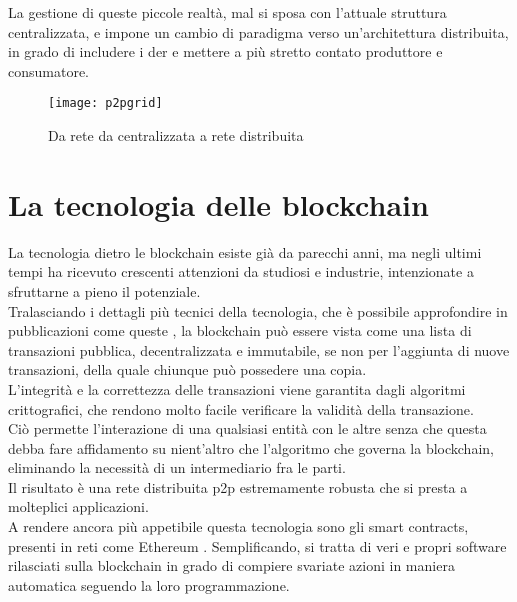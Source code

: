 La gestione di queste piccole realtà, mal si sposa con l'attuale struttura centralizzata, e impone un cambio di paradigma verso un'architettura distribuita, 
in grado di includere i \gls{der} e mettere a più stretto contato produttore e consumatore.

\begin{figure}[h]
    \texttt{[image: p2pgrid]}
    \centering
    \caption{Da rete da centralizzata a rete distribuita \cite{img:p2pgrid}}
    \label{lab:p2pgrid}
\end{figure}


\section{La tecnologia delle blockchain}
La tecnologia dietro le blockchain esiste già da parecchi anni, ma negli ultimi tempi ha ricevuto crescenti attenzioni da studiosi e industrie, intenzionate a sfruttarne a pieno il potenziale. \\

Tralasciando i dettagli più tecnici della tecnologia, che è possibile approfondire in pubblicazioni come queste \cite{art:blockchain} \cite{art:blockchain-for-industry}, 
la blockchain può essere vista come una lista di transazioni pubblica, decentralizzata e immutabile, se non per l'aggiunta di nuove transazioni, della quale chiunque può possedere una copia. \\
L'integrità e la correttezza delle transazioni viene garantita dagli algoritmi crittografici, che rendono molto facile verificare la validità della transazione. \\
Ciò permette l'interazione di una qualsiasi entità con le altre senza che questa debba fare affidamento su nient'altro che l'algoritmo che governa la blockchain, eliminando la necessità di un intermediario fra le parti. \\
Il risultato è una rete distribuita \gls{p2p} estremamente robusta che si presta a molteplici applicazioni. \\
A rendere ancora più appetibile questa tecnologia sono gli smart contracts, presenti in reti come Ethereum \cite{wiki:eth-smart-contracts}. Semplificando, si tratta di veri e propri software rilasciati sulla blockchain 
in grado di compiere svariate azioni in maniera automatica seguendo la loro programmazione. \\